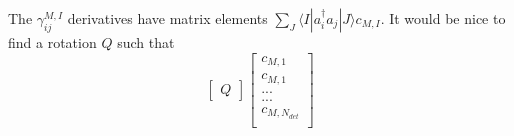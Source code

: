 \documentclass[12pt]{article}
\begin{document}
\noindent The $\gamma_{ij}^{M,I}$ derivatives have matrix elements $\sum_{J}\langle I | a^{\dagger}_{i} a_{j} | J \rangle c_{M,I} $.  It would be 
nice to find a rotation $Q$ such that
\begin{equation}
\begin{bmatrix}
Q
\end{bmatrix}
\begin{bmatrix}
c_{M,1}\\
c_{M,1}\\
...\\
...\\
c_{M,N_{det}}\\
\end{bmatrix}
\end{equation} 
 
\end{document}
